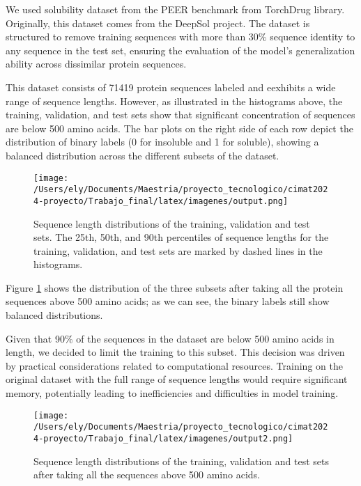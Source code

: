 \documentclass[letterpaper,spanish,reprint,nofootinbib,showkeys,aps]{revtex4-2}
\begin{document}
We used solubility dataset from the PEER benchmark from TorchDrug library. Originally, this dataset comes from the DeepSol \cite{deepsol} project. The dataset is structured to remove training sequences with more than 30$\%$ sequence identity to any sequence in the test set, ensuring the evaluation of the model's generalization ability across dissimilar protein sequences.

This dataset consists of 71419 protein sequences labeled and eexhibits a wide range of sequence lengths. However, as illustrated in the histograms above, the training, validation, and test sets show that significant concentration of sequences are below 500 amino acids. The bar plots on the right side of each row depict the distribution of binary labels (0 for insoluble and 1 for soluble), showing a balanced distribution across the different subsets of the dataset. 


\begin{figure} [H]
	\begin{center}
		\texttt{[image: /Users/ely/Documents/Maestria/proyecto\_tecnologico/cimat2024-proyecto/Trabajo\_final/latex/imagenes/output.png]}
		\caption{Sequence length distributions of the training, validation and test sets. The 25th, 50th, and 90th percentiles of sequence lengths for the training, validation, and test sets are marked by dashed lines in the histograms.}
   \end{center} 
\end{figure}



Figure \ref{500amino} shows the distribution of the three subsets after taking all the protein sequences above 500 amino acids; as we can see, the binary labels still show balanced distributions.


Given that 90$\%$ of the sequences in the dataset are below 500 amino acids in length, we decided to limit the training to this subset. This decision was driven by practical considerations related to computational resources. Training on the original dataset with the full range of sequence lengths would require significant memory, potentially leading to inefficiencies and difficulties in model training. 


\begin{figure} [H]
	\begin{center}
		\texttt{[image: /Users/ely/Documents/Maestria/proyecto\_tecnologico/cimat2024-proyecto/Trabajo\_final/latex/imagenes/output2.png]}
		\caption{Sequence length distributions of the training, validation and test sets after taking all the sequences above 500 amino acids.}
      \label{500amino}
   \end{center} 
\end{figure}
\end{document}
